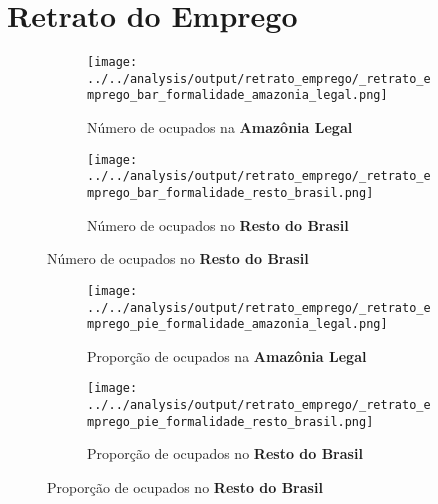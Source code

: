\documentclass[11pt]{beamer}
\begin{document}
\section{Retrato do Emprego}

\begin{frame}[label=_retrato_emprego_bar_formalidade]{}
\textit{\hyperlink{indice_principal}{}}
\begin{figure}
\centering
\begin{subfigure}{.5\textwidth}
  \centering
  \texttt{[image: ../../analysis/output/retrato\_emprego/\_retrato\_emprego\_bar\_formalidade\_amazonia\_legal.png]}
  \label{fig:_retrato_emprego_bar_formalidade_amazonia_legal}
  \caption{{\tiny Número de ocupados na \textbf{Amazônia Legal}}}
\end{subfigure}%
\begin{subfigure}{.5\textwidth}
  \centering
  \texttt{[image: ../../analysis/output/retrato\_emprego/\_retrato\_emprego\_bar\_formalidade\_resto\_brasil.png]}
  \label{fig:_retrato_emprego_bar_formalidade_resto_brasil}
   \caption{{\tiny Número de ocupados no \textbf{Resto do Brasil}}}
\end{subfigure}
\end{figure}
\end{frame}

\begin{frame}[label=_retrato_emprego_pie_formalidade]{}
\textit{\hyperlink{indice_principal}{}}
\begin{figure}
\centering
\begin{subfigure}{.5\textwidth}
  \centering
  \texttt{[image: ../../analysis/output/retrato\_emprego/\_retrato\_emprego\_pie\_formalidade\_amazonia\_legal.png]}
  \label{fig:_retrato_emprego_pie_formalidade_amazonia_legal}
  \caption{{\tiny Proporção de ocupados na \textbf{Amazônia Legal}}}
\end{subfigure}%
\begin{subfigure}{.5\textwidth}
  \centering
  \texttt{[image: ../../analysis/output/retrato\_emprego/\_retrato\_emprego\_pie\_formalidade\_resto\_brasil.png]}
  \label{fig:_retrato_emprego_pie_formalidade_resto_brasil}
   \caption{{\tiny Proporção de ocupados no \textbf{Resto do Brasil}}}
\end{subfigure}
\end{figure}
\end{frame}
\end{document}
